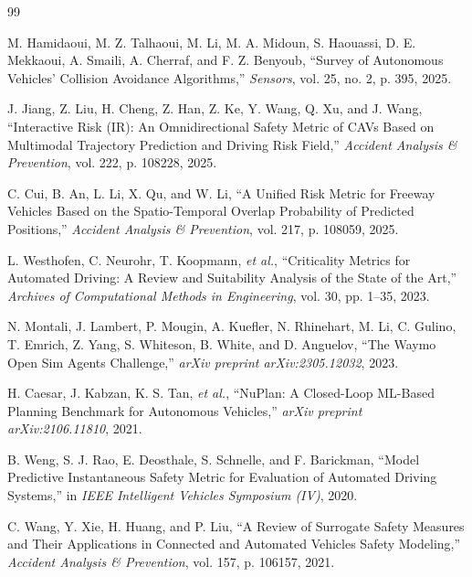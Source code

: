 \documentclass[letterpaper, 10 pt, conference]{ieeeconf}  %
\begin{document}
\balance
\begin{thebibliography}{99}
\scriptsize

M. Hamidaoui, M. Z. Talhaoui, M. Li, M. A. Midoun, S. Haouassi, D. E. Mekkaoui, A. Smaili, A. Cherraf, and F. Z. Benyoub,
\newblock “Survey of Autonomous Vehicles’ Collision Avoidance Algorithms,”
\newblock \emph{Sensors}, vol. 25, no. 2, p. 395, 2025.

J. Jiang, Z. Liu, H. Cheng, Z. Han, Z. Ke, Y. Wang, Q. Xu, and J. Wang,
\newblock ``Interactive Risk (IR): An Omnidirectional Safety Metric of CAVs Based on Multimodal Trajectory Prediction and Driving Risk Field,''
\newblock \emph{Accident Analysis \& Prevention}, vol. 222, p. 108228, 2025.

C. Cui, B. An, L. Li, X. Qu, and W. Li,
\newblock ``A Unified Risk Metric for Freeway Vehicles Based on the Spatio-Temporal Overlap Probability of Predicted Positions,''
\newblock \emph{Accident Analysis \& Prevention}, vol. 217, p. 108059, 2025.

L. Westhofen, C. Neurohr, T. Koopmann, \emph{et al.},
\newblock ``Criticality Metrics for Automated Driving: A Review and Suitability Analysis of the State of the Art,''
\newblock \emph{Archives of Computational Methods in Engineering}, vol. 30, pp. 1--35, 2023.

N. Montali, J. Lambert, P. Mougin, A. Kuefler, N. Rhinehart, M. Li, C. Gulino, T. Emrich, Z. Yang, S. Whiteson, B. White, and D. Anguelov,
\newblock ``The Waymo Open Sim Agents Challenge,''
\newblock \emph{arXiv preprint arXiv:2305.12032}, 2023.

H. Caesar, J. Kabzan, K. S. Tan, \emph{et al.},
\newblock ``NuPlan: A Closed-Loop ML-Based Planning Benchmark for Autonomous Vehicles,''
\newblock \emph{arXiv preprint arXiv:2106.11810}, 2021.

B. Weng, S. J. Rao, E. Deosthale, S. Schnelle, and F. Barickman,
\newblock ``Model Predictive Instantaneous Safety Metric for Evaluation of Automated Driving Systems,''
\newblock in \emph{IEEE Intelligent Vehicles Symposium (IV)}, 2020.

C. Wang, Y. Xie, H. Huang, and P. Liu,
\newblock ``A Review of Surrogate Safety Measures and Their Applications in Connected and Automated Vehicles Safety Modeling,''
\newblock \emph{Accident Analysis \& Prevention}, vol. 157, p. 106157, 2021.


\end{thebibliography}
\end{document}
